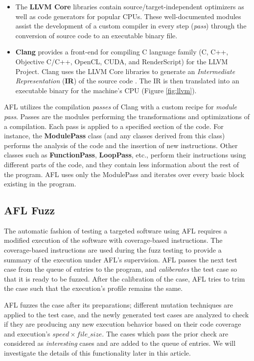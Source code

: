 \begin{itemize}
    \item The \textbf{LLVM Core} libraries contain source/target-independent optimizers as well as code generators for popular CPUs. These well-documented modules assist the development of a custom compiler in every step (\textit{pass}) through the conversion of source code to an executable binary file.
    
    \item \textbf{Clang} \cite{clang} provides a front-end for compiling C language family (C, C++, Objective C/C++, OpenCL, CUDA, and RenderScript) for the LLVM Project. Clang uses the LLVM Core libraries to generate an \textit{Intermediate Representation} (\textbf{IR}) of the source code \cite{lattner2004llvm}. The IR is then translated into an executable binary for the machine's CPU (Figure \ref{fig:llvm}).
\end{itemize}

AFL utilizes the compilation \textit{passes} of Clang with a custom recipe for \textit{module pass}. Passes are the modules performing the transformations and optimizations of a compilation. Each pass is applied to a specified section of the code. For instance, the \textbf{ModulePass} class (and any classes derived from this class) performs the analysis of the code and the insertion of new instructions. Other classes such as \textbf{FunctionPass}, \textbf{LoopPass}, etc., perform their instructions using different parts of the code, and they contain less information about the rest of the program. AFL uses only the ModulePass and iterates over every basic block existing in the program.

\subsection{AFL Fuzz}

The automatic fashion of testing a targeted software using AFL requires a modified execution of the software with coverage-based instructions. The coverage-based instructions are used during the fuzz testing to provide a summary of the execution under AFL's supervision. AFL passes the next test case from the queue of entries to the program, and \textit{caliberates} the test case so that it is ready to be fuzzed. After the calibration of the case, AFL tries to trim the case such that the execution's profile remains the same.

AFL fuzzes the case after its preparations; different mutation techniques are applied to the test case, and the newly generated test cases are analyzed to check if they are producing any new execution behavior based on their code coverage and execution's $speed \times file\_size$. The cases which pass the prior check are considered as \textit{interesting} cases and are added to the queue of entries. We will investigate the details of this functionality later in this article. 

